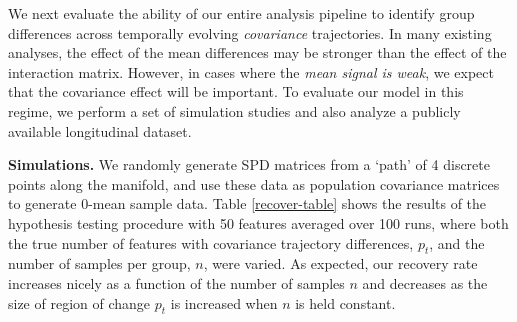 We next evaluate the ability of our entire analysis 
pipeline to identify group differences across temporally evolving \textit{covariance} trajectories. 
In many existing analyses, the effect of the mean differences may be stronger than the effect of the interaction matrix. 
However, in cases where the {\em mean signal is weak}, we expect that the covariance effect will be important. To evaluate 
our model in this regime, we perform a set of simulation studies and also analyze a publicly available longitudinal dataset.

{\bf Simulations.} We randomly generate SPD matrices from a `path' of 4 discrete points along the manifold, and use these data 
as population 
covariance matrices to generate 0-mean sample data. Table \ref{recover-table} shows the results of the hypothesis testing 
procedure with 50 features averaged over 100 runs, where both the true number of features with covariance trajectory differences, $p_t$, 
and the number of samples per group, $n$, were varied. 
As expected, our recovery rate increases nicely 
as a function of the number of samples $n$ and decreases as the size of region of change $p_t$ is increased when $n$ is held constant.


